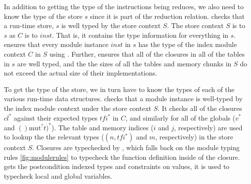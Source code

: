 In addition to getting the type of the instructions being reduces, we also need to know the type of the store $s$ since it is part of the reduction relation.
 checks that a run-time store, $s$ is well typed by the store context $S$.
The store context $S$ is to $s$ as $C$ is to $inst$.
That is, it contains the type information for everything in $s$.
 ensures that every module instance $inst$ in $s$ has the type of the index module context $C$ in $S$ using .
Further,  ensures that all of the closures in all of the tables in $s$ are well typed, and the the sizes of all the tables and memory chunks in $S$ do not exceed the actual size of their implementations.

To get the type of the store, we in turn have to know the types of each of the various run-time data structures.
 checks that a module instance is well-typed by the index module context under the store context $S$.
It checks all of the closures $cl^{*}$ against their expected types $tfi^{*}$ in $C$, and similarly for all of the globals ($v^{*}$ and $()\text{mut}^{?} t)^{*}$).
The table and memory indices ($i$ and $j$, respectively) are used to lookup the the relevant types ($(n,tfi^{*})$ and $m$, respectively) in the store context $S$.
Closures are typechecked by , which falls back on the module typing rules \autoref{fig:modulerules} to typecheck the function definition inside of the closure.
 gets the postcondition indexed types and constraints on values, it is used to typecheck local and global variables.

